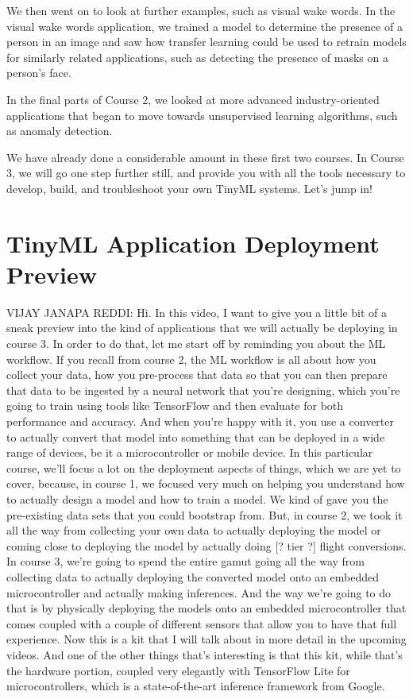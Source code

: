 We then went on to look at further examples, such as visual wake words. In the visual wake words application, we trained a model to determine the presence of a person in an image and saw how transfer learning could be used to retrain models for similarly related applications, such as detecting the presence of masks on a person’s face.

In the final parts of Course 2, we looked at more advanced industry-oriented applications that began to move towards unsupervised learning algorithms, such as anomaly detection.

We have already done a considerable amount in these first two courses. In Course 3, we will go one step further still, and provide you with all the tools necessary to develop, build, and troubleshoot your own TinyML systems. Let’s jump in!



\section{TinyML Application Deployment Preview}

VIJAY JANAPA REDDI: Hi.
In this video, I want to give you a little bit of a sneak preview into the kind of applications that we will actually be deploying in course 3. In order to do that, let me start off by reminding you about the ML workflow. If you recall from course 2, the ML workflow is all about how you collect your data, how you pre-process that data so that you can then prepare that data to be ingested by a neural network that you're designing, which you're going to train using tools like TensorFlow and then evaluate for both performance and accuracy.
And when you're happy with it, you use a converter to actually convert that model into something that can be deployed in a wide range of devices, be it a microcontroller or mobile device.
In this particular course, we'll focus a lot on the deployment aspects of things, which we are yet to cover, because, in course 1, we focused very much on helping you understand how to actually design a model and how to train a model.
We kind of gave you the pre-existing data sets that you could bootstrap from.
But, in course 2, we took it all the way from collecting your own data to actually deploying the model or coming close to deploying the model by actually doing [? tier ?] flight conversions.
In course 3, we're going to spend the entire gamut going all the way from collecting data to actually deploying the converted model onto an embedded microcontroller and actually making inferences.
And the way we're going to do that is by physically deploying the models onto an embedded microcontroller that comes coupled with a couple of different sensors that allow you to have that full experience.
Now this is a kit that I will talk about in more detail in the upcoming videos.
And one of the other things that's interesting is that this kit, while that's the hardware portion, coupled very elegantly with TensorFlow Lite for microcontrollers, which is a state-of-the-art inference framework from Google.

